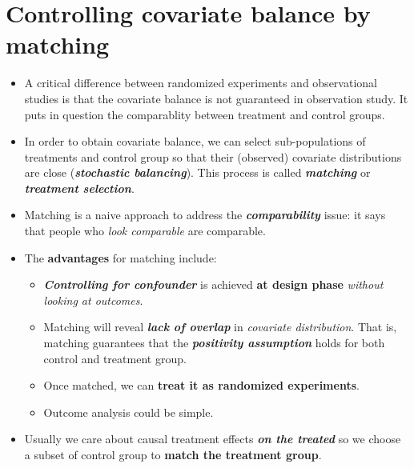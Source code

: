 \documentclass[11pt]{article}
\begin{document}
\section{Controlling covariate balance by matching}
\begin{itemize}
\item A critical difference between randomized experiments and observational studies is that the covariate balance is not guaranteed in observation study. It puts in question the comparablity between treatment and control groups. 

\item In order to obtain covariate balance, we can select sub-populations of treatments and control group so that their (observed) covariate distributions are close (\emph{\textbf{stochastic balancing}}). This process is called \emph{\textbf{matching}} or \emph{\textbf{treatment selection}}. 

\item Matching is a naive approach to address the \emph{\textbf{comparability}} issue: it says that people who \emph{look comparable} are comparable.

\item The \textbf{advantages} for matching include:
\begin{itemize}
\item \emph{\textbf{Controlling for confounder}} is achieved \textbf{at design phase} \emph{without looking at outcomes}. 

\item Matching will reveal \emph{\textbf{lack of overlap}} in \emph{covariate distribution}. That is, matching guarantees that the \textbf{\emph{positivity assumption}} holds for both control and treatment group.

\item Once matched, we can \textbf{treat it as randomized experiments}. 

\item Outcome analysis could be simple.
\end{itemize}

\item Usually we care about causal treatment effects \emph{\textbf{on the treated}} so we choose a subset of control group to \textbf{match the treatment group}.
\end{itemize}
\end{document}
